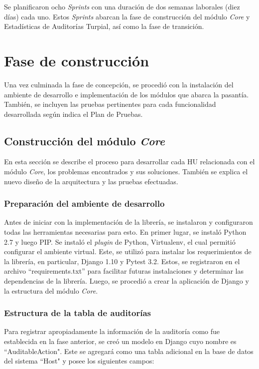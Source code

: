 Se planificaron ocho \textit{Sprints} con una duración de dos semanas laborales (diez días) cada uno. Estos \textit{Sprints} abarcan la fase de construcción del módulo \textit{Core} y Estadísticas de Auditorías Turpial, así como la fase de transición.

\section{Fase de construcción}

Una vez culminada la fase de concepción, se procedió con la instalación del ambiente de desarrollo e implementación de los módulos que abarca la pasantía. También, se incluyen las pruebas pertinentes para cada funcionalidad desarrollada según indica el Plan de Pruebas.

\subsection{Construcción del módulo \textit{Core}}

En esta sección se describe el proceso para desarrollar cada HU relacionada con el módulo \textit{Core}, los problemas encontrados y sus soluciones. También se explica el nuevo diseño de la arquitectura y las pruebas efectuadas.

\subsubsection{Preparación del ambiente de desarrollo}

Antes de iniciar con la implementación de la librería, se instalaron y configuraron todas las herramientas necesarias para esto. En primer lugar, se instaló Python 2.7 y luego PIP. Se instaló el \textit{plugin} de Python, Virtualenv, el cual permitió configurar el ambiente virtual. Este, se utilizó para instalar los requerimientos de la librería, en particular, Django 1.10 y Pytest 3.2. Estos, se registraron en el archivo “requirements.txt” para facilitar futuras instalaciones y determinar las dependencias de la librería. Luego, se procedió a crear la aplicación de Django y la estructura del módulo \textit{Core}.

\subsubsection{Estructura de la tabla de auditorías}

Para registrar apropiadamente la información de la auditoría como fue establecida en la fase anterior, se creó un modelo en Django cuyo nombre es “AuditableAction". Este se agregará como una tabla adicional en la base de datos del sistema “Host" y posee los siguientes campos:\\

